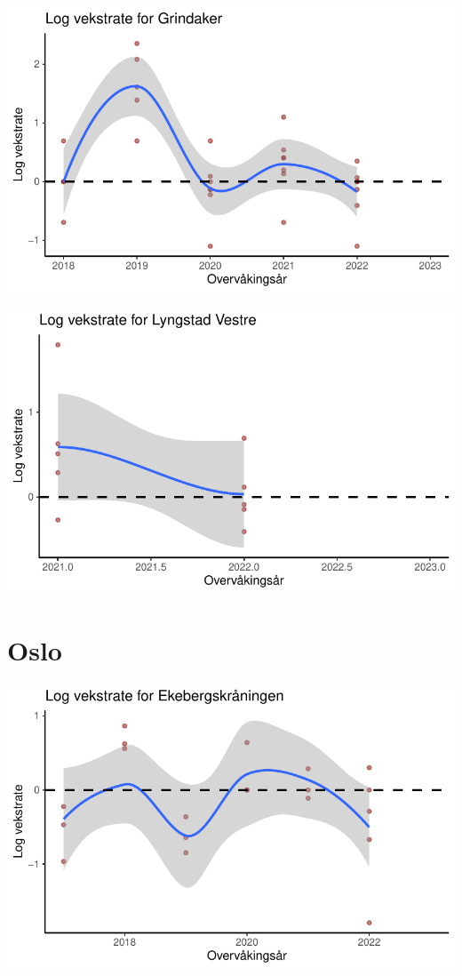 \documentclass[
  letterpaper,
  DIV=11,
  numbers=noendperiod]{scrreport}
\begin{document}
\includegraphics{growthRate_files/figure-pdf/unnamed-chunk-3-5.pdf}

\includegraphics{growthRate_files/figure-pdf/unnamed-chunk-3-6.pdf}

\hypertarget{oslo-1}{%
\section{Oslo}\label{oslo-1}}

\includegraphics{growthRate_files/figure-pdf/unnamed-chunk-4-1.pdf}
\end{document}

